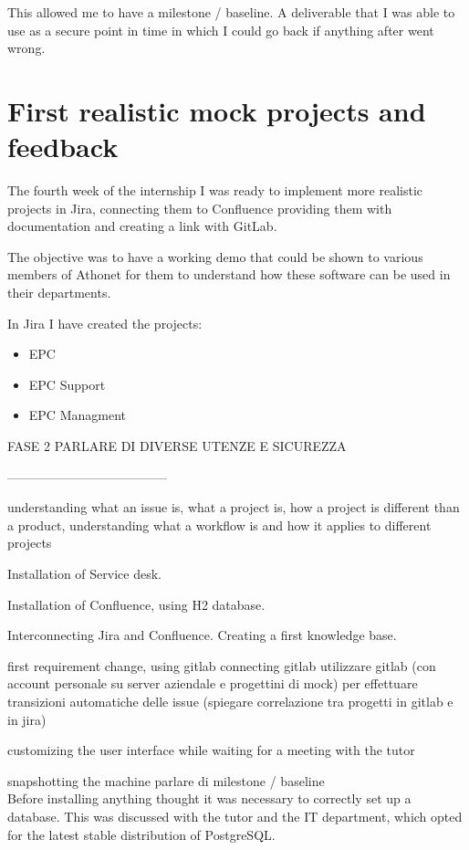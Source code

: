 	This allowed me to have a milestone / baseline.
	A deliverable that I was able to use as a secure point in time in which I could go back if anything after went wrong.
	
\section{First realistic mock projects and feedback}
	
	The fourth week of the internship I was ready to implement more realistic projects in Jira, connecting them to Confluence providing them with documentation and creating a link with GitLab.
	
	The objective was to have a working demo that could be shown to various members of Athonet for them to understand how these software can be used in their departments.
	
	In Jira I have created the projects:
	\begin{itemize}
		\item EPC
		\item EPC Support
		\item EPC Managment
	\end{itemize}
	
	FASE 2 PARLARE DI DIVERSE UTENZE E SICUREZZA
	
	--------------------------------------
	
	understanding what an issue is, what a project is, how a project is different than a product, understanding what a workflow is and how it applies to different projects
	
	Installation of Service desk.
	
	Installation of Confluence, using H2 database.
	
	
	Interconnecting Jira and Confluence.
	Creating a first knowledge base.
	
	
	first requirement change, using gitlab
	connecting gitlab
	utilizzare gitlab (con account personale su server aziendale e progettini di mock) per effettuare transizioni automatiche delle issue (spiegare correlazione tra progetti in gitlab e in jira)
	
	customizing the user interface while waiting for a meeting with the tutor
	
	
	snapshotting the machine
	parlare di milestone / baseline\\
	
	
	
	
	Before installing anything thought it was necessary to correctly set up a database.
	This was discussed with the tutor and the IT department, which opted for the latest stable distribution of PostgreSQL.

